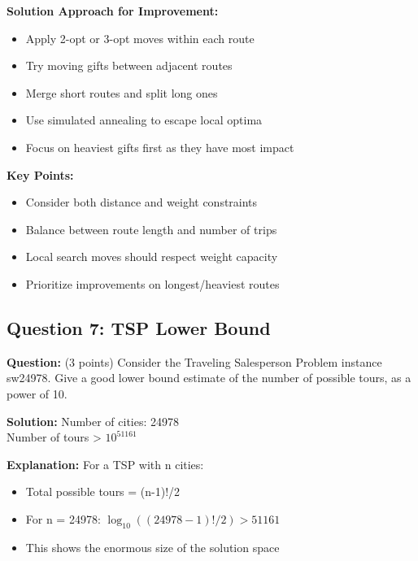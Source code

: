 \textbf{Solution Approach for Improvement:}
\begin{itemize}
\item Apply 2-opt or 3-opt moves within each route
\item Try moving gifts between adjacent routes
\item Merge short routes and split long ones
\item Use simulated annealing to escape local optima
\item Focus on heaviest gifts first as they have most impact
\end{itemize}

\textbf{Key Points:}
\begin{itemize}
\item Consider both distance and weight constraints
\item Balance between route length and number of trips
\item Local search moves should respect weight capacity
\item Prioritize improvements on longest/heaviest routes
\end{itemize}

\subsection{Question 7: TSP Lower Bound}
\textbf{Question:} (3 points) Consider the Traveling Salesperson Problem instance sw24978. Give a good lower bound estimate of the number of possible tours, as a power of 10.

\textbf{Solution:} 
Number of cities: 24978\\
Number of tours > $10^{51161}$

\textbf{Explanation:}
For a TSP with n cities:
\begin{itemize}
\item Total possible tours = (n-1)!/2
\item For n = 24978: $\log_{10}((24978-1)!/2) > 51161$
\item This shows the enormous size of the solution space
\end{itemize}

